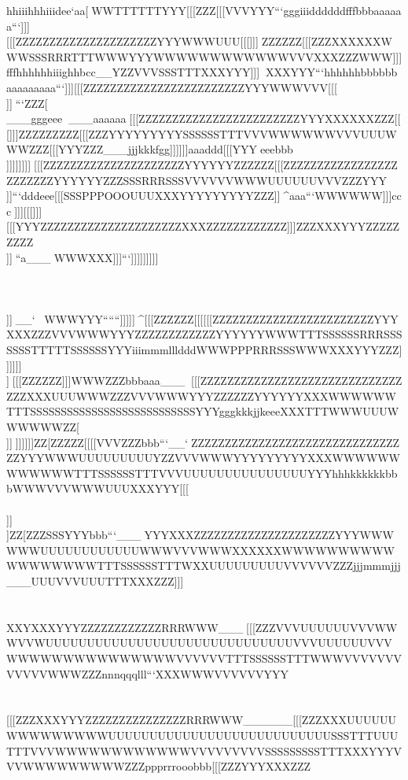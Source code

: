 hhiiihhhiiidee`aa[^^WWWTTTTTTYYY[[[ZZZ[[[VVVYYY```gggiiiddddddfffbbbaaaaaa```]]][[[ZZZZZZZZZZZZZZZZZZZZZYYYWWWUUU[[[]]]^^^ZZZZZZ[[[ZZZXXXXXXWWWSSSRRRTTTWWWYYYWWWWWWWWWWWWVVVXXXZZZWWW]]]fffhhhhhhiiighhbcc\__YZZVVVSSSTTTXXXYYY]]]^^^^^^XXXYYY```hhhhhhbbbbbbaaaaaaaaa```]]][[[ZZZZZZZZZZZZZZZZZZZZZZZZYYYWWWVVV[[[^^^\\\ZZZZZZ[[[ZZZXXXYYYWWWSSSRRRTTTWWWYYYWWWVVVVVVYYYXXXZZZXXXYYY___hhhiiijjjghh`ccX\\XXXRRRSSSWWWYYYYYYZZZ]]]^^^```ZZZ[\\___gggeee^^^^^^___aaaaaa^^^[[[ZZZZZZZZZZZZZZZZZZZZZZZZYYYXXXXXXZZZ[[[]]]ZZZZZZZZZ[[[ZZZYYYYYYYYYSSSSSSTTTVVVWWWWWWVVVUUUWWWZZZ[[[YYYZZZ___jjjkkkfgg\ccYYYTTTPPPTTTXXXYYYYYYYYY]]]]]]aaaddd[[[YYY^^^eeebbb\\\]]]]]]]]]^^^[[[ZZZZZZZZZZZZZZZZZZZZZYYYYYYZZZZZZ[[[ZZZZZZZZZZZZZZZZZZZZZZZZYYYYYYZZZSSSRRRSSSVVVVVVWWWUUUUUUVVVZZZYYY\\\]]]```dddeee[[[SSSPPPOOOUUUXXXYYYYYYYYYZZZ]]^^^^aaa```WWWWWW]]]ccc^^^]]][[[]]][[[YYYZZZZZZZZZZZZZZZZZZZZZXXXZZZZZZZZZZZZ]]]ZZZXXXYYYZZZZZZZZZ\\\ZZZYYYYYYYYYSSSQQQPPPUUUUUUWWWUUUUUUVVV[[[^^^fffeeebbb^^^XXXPPPMMMPPPWWWWWWXXXYYZYYYZZZ]]]^^_``a___^^^WWWXXX]]]```]]]]]]]]]\\\XXXZZZZZZZZZZZZZZZZZZYYYZZZZZZZZZZZZZZZZZZ\\\WWWWWWYYYZZZZZZZZZ\\\ZZZYYYYYYVVVSSSRRRPPPUUUUUUVVVUUUUUUUUUZZZeeelllmmmgggZZZQQQPPPPPPVVVYYYZZZZZZYYZ\\\]]]^^^__`^^^^^^^^^WWWYYY``````]]]]]^^^^[[[ZZZZZZ[[[[[[ZZZZZZZZZZZZZZZZZZZZZZZZYYYXXXZZZVVVWWWYYYZZZZZZZZZZZZYYYYYYWWWTTTSSSSSSRRRSSSSSSSTTTTTSSSSSSYYYiiimmmllldddWWWPPPRRRSSSWWWXXXYYYZZZ]]]]]]\\]^^_[[[ZZZZZZ]]]WWWZZZbbbaaa___^^^^^^[[[ZZZZZZZZZZZZZZZZZZZZZZZZZZZZZZZZZXXXUUUWWWZZZVVVWWWYYYZZZZZZYYYYYYXXXWWWWWWTTTSSSSSSSSSSSSSSSSSSSSSSSSSSSYYYgggkkkjjkeeeXXXTTTWWWUUUWWWWWWZZ[\\\]]]^^^]]]]]]ZZ[ZZZZZ[[[[VVVZZZbbb```__`^^^ZZZZZZZZZZZZZZZZZZZZZZZZZZZZZZZZZYYYWWWUUUUUUUUUYZZVVVWWWYYYYYYYYYXXXWWWWWWWWWWWWTTTSSSSSSTTTVVVUUUUUUUUUUUUUUUYYYhhhkkkkkkbbbWWWVVVWWWUUUXXXYYY[[[\\\\\][[[[[\\\\]]]\\]ZZ[ZZZSSSYYYbbb```___^^^YYYXXXZZZZZZZZZZZZZZZZZZZZZYYYWWWWWWUUUUUUUUUUUUWWWVVVWWWXXXXXXWWWWWWWWWWWWWWWWWWTTTSSSSSSTTTWXXUUUUUUUUUVVVVVVZZZjjjmmmjjj___UUUVVVUUUTTTXXXZZZ]]]\\\\\\XXYXXXYYYZZZZZZZZZZZZRRRWWW___^^^[[[ZZZVVVUUUUUUVVVWWWVVWUUUUUUUUUUUUUUUUUUUUUUUUUUUUUUVVVUUUUUUVVVWWWWWWWWWWWWWWWVVVVVVTTTSSSSSSTTTWWWVVVVVVVVVVVVWWWZZZnnnqqqlll```XXXWWWVVVVVVYYY\\\\\\[[[ZZZXXXYYYZZZZZZZZZZZZZZZRRRWWW______[[[ZZZXXXUUUUUUWWWWWWWWWUUUUUUUUUUUUUUUUUUUUUUUUUUUSSSTTTUUUTTTVVVWWWWWWWWWWWWVVVVVVVVVSSSSSSSSSTTTXXXYYYVVVWWWWWWWWWZZZppprrrooobbb[[[ZZZYYYXXXZZZ
